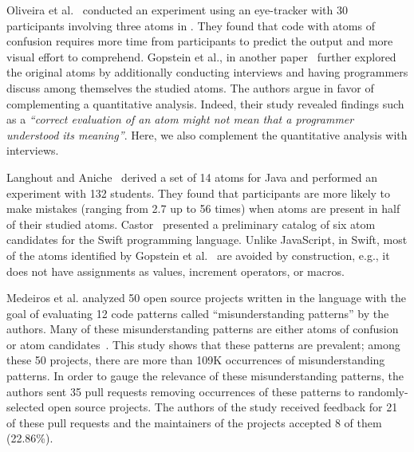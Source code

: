 
Oliveira et al.~\cite{TheEyesDoNotLie} conducted an experiment using an eye-tracker with 30 participants involving three atoms in \clang. They found that code with atoms of confusion requires more time from participants to predict the output and more visual effort to comprehend. Gopstein et al., in another paper~\cite{ThinkingAloud} further explored the original atoms by additionally conducting interviews and having programmers discuss among themselves the studied atoms. The authors argue in favor of complementing a quantitative analysis. Indeed, their study revealed findings such as a \textit{``correct evaluation of an atom might not mean that a programmer understood its meaning''}. Here, we also complement the quantitative analysis with interviews.

Langhout and Aniche~\cite{Langhout:2021:ACJ} derived a set of 14 atoms for Java and performed an experiment with 132 students. They found that participants are more likely to make mistakes (ranging from 2.7 up to 56 times) when atoms are present in half of their studied atoms. Castor~\cite{castor2018} presented a preliminary catalog of six atom candidates for the Swift programming language. Unlike JavaScript, in Swift, most of the atoms identified by Gopstein et al.~\cite{DBLP:conf/sigsoft/GopsteinIYDZYC17} are avoided by construction, e.g., it does not have assignments as values, increment operators, or macros. 

Medeiros et al. \cite{DBLP:journals/ese/MedeirosLAAKRG19} analyzed 50 open source projects written in the \clang language with the goal of evaluating 12 code patterns called ``misunderstanding patterns'' by the authors. Many of these misunderstanding patterns are either atoms of confusion or atom candidates~\cite{DBLP:conf/sigsoft/GopsteinIYDZYC17}. This study shows that these patterns are prevalent; among these 50 projects, there are more than 109K occurrences of misunderstanding patterns. 
In order to gauge the relevance of these misunderstanding patterns, the authors sent 35 pull requests removing occurrences of these patterns to randomly-selected open source projects. The authors of the study received feedback for 21 of these pull requests and the maintainers of the projects accepted 8 of them (22.86\%). 

